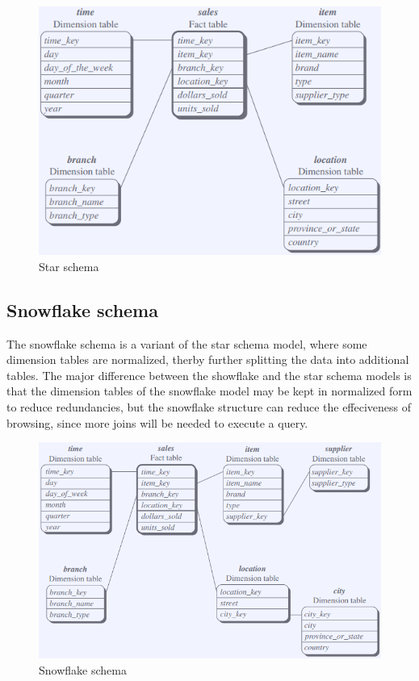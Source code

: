 		\begin{figure}[H]
			\centering
				\includegraphics[scale=0.4]{pics/star.png}
				\caption{Star schema}
		\end{figure}

	\clearpage
		\subsection*{Snowflake schema} 

		The snowflake schema is a variant of the star schema model, where some dimension
		tables are normalized, therby further splitting the data into additional tables.
		The major difference between the showflake and the star schema models is that the
		dimension tables of the snowflake model may be kept in normalized form to reduce
		redundancies, but the snowflake structure can reduce the effeciveness of browsing, 
		since more joins will be needed to execute a query. 

		\begin{figure}[H]
			\centering
			\includegraphics[scale=0.4]{pics/snowflake.png}
			\caption{Snowflake schema}
		\end{figure}

